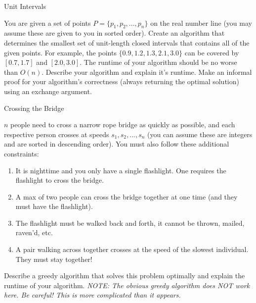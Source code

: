 \documentclass[10pt]{article}
\begin{document}
\thispagestyle{empty}
\handout

\begin{problem}Unit Intervals\end{problem}

You are given a set of points $P = \{p_1 , p_2 , ..., p_n \}$ on the real number line (you may assume these are given to you in sorted order). Create an algorithm that determines the smallest set of unit-length closed intervals that contains all of the given points. For example, the points $\{0.9, 1.2, 1.3, 2.1, 3.0\}$ can be covered by $[0.7, 1.7]$ and $[2.0, 3.0]$. The runtime of your algorithm should be no worse than $O(n)$. Describe your algorithm and explain it's runtime. Make an informal proof for your algorithm's correctness (always returning the optimal solution) using an exchange argument.  

\solution{
}

\begin{problem} Crossing the Bridge \end{problem}
    $n$ people need to cross a narrow rope bridge as quickly as possible, and each respective person crosses at speeds $s_1, s_2, ... , s_n$ (you can assume these are integers and are sorted in descending order). You must also follow these additional constraints:

    \begin{enumerate}
        \item It is nighttime and you only have a single flashlight. One requires the flashlight to cross the bridge.
        \item A max of two people can cross the bridge together at one time (and they must have the flashlight).
        \item The flashlight must be walked back and forth, it cannot be thrown, mailed, raven'd, etc.
        \item A pair walking across together crosses at the speed of the slowest individual. They must stay together!
    \end{enumerate}

    Describe a greedy algorithm that solves this problem optimally and explain the runtime of your algorithm. \emph{NOTE: The obvious greedy algorithm does NOT work here. Be careful! This is more complicated than it appears.}


\solution{
}


\end{document}
